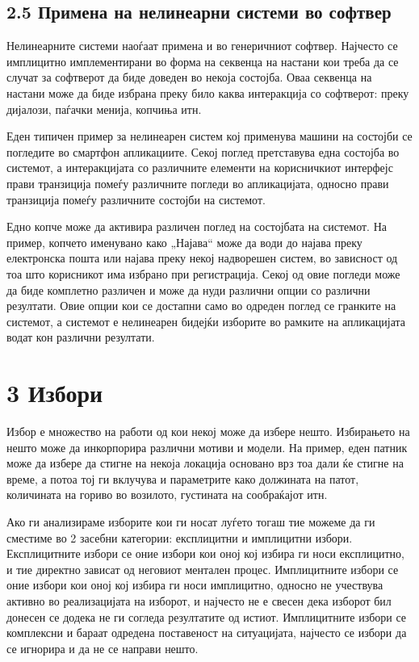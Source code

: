 \subsection{2.5 Примена на нелинеарни системи во софтвер}

Нелинеарните системи наоѓаат примена и во генеричниот софтвер. Најчесто се имплицитно имплементирани во форма на секвенца на настани кои треба да се случат за софтверот да биде доведен во некоја состојба. Оваа секвенца на настани може да биде избрана преку било каква интеракција со софтверот: преку дијалози, паѓачки менија, копчиња итн.

Еден типичен пример за нелинеарен систем кој применува машини на состојби се погледите во смартфон апликациите. Секој поглед претставува една состојба во системот, а интеракцијата со различните елементи на корисничкиот интерфејс прави транзиција помеѓу различните погледи во апликацијата, односно прави транзиција помеѓу различните состојби на системот.

Едно копче може да активира различен поглед на состојбата на системот. На пример, копчето именувано како „Најава“ може да води до најава преку електронска пошта или најава преку некој надворешен систем, во зависност од тоа што корисникот има избрано при регистрација. Секој од овие погледи може да биде комплетно различен и може да нуди различни опции со различни резултати. Овие опции кои се достапни само во одреден поглед се гранките на системот, а системот е нелинеарен бидејќи изборите во рамките на апликацијата водат кон различни резултати.

\section{3 Избори}

Избор е множество на работи од кои некој може да избере нешто. Избирањето на нешто може да инкорпорира различни мотиви и модели. На пример, еден патник може да избере да стигне на некоја локација основано врз тоа дали ќе стигне на време, а потоа тој ги вклучува и параметрите како должината на патот, количината на гориво во возилото, густината на сообраќајот итн.

Ако ги анализираме изборите кои ги носат луѓето тогаш тие можеме да ги сместиме во 2 засебни категории: експлицитни и имплицитни избори. Експлицитните избори се оние избори кои оној кој избира ги носи експлицитно, и тие директно зависат од неговиот ментален процес. Имплицитните избори се оние избори кои оној кој избира ги носи имплицитно, односно не учествува активно во реализацијата на изборот, и најчесто не е свесен дека изборот бил донесен се додека не ги согледа резултатите од истиот. Имплицитните избори се комплексни и бараат одредена поставеност на ситуацијата, најчесто се избори да се игнорира и да не се направи нешто.

